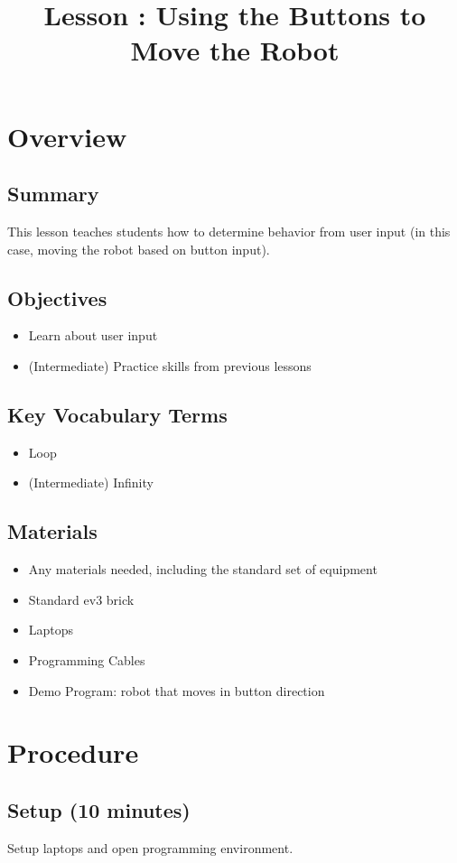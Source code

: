 \documentclass{lessonplan}
\title{Lesson \lessonNumber:  Using the Buttons to Move the Robot}
\author{\linkHome}
\date{}
\begin{document}
  \maketitle

  \section{Overview}
    \subsection{Summary}
      This lesson teaches students how to determine behavior from user input (in this case, moving the robot based on button input). 
    \subsection{Objectives}
    \begin{itemize}
      \item Learn about user input
      \item (Intermediate) Practice skills from previous lessons
    \end{itemize}
    \subsection{Key Vocabulary Terms}
    \begin{itemize}
      \item Loop
      \item (Intermediate) Infinity
    \end{itemize}
    \subsection{Materials}
      \begin{itemize}
        \item Any materials needed, including the standard set of
          equipment
        \item Standard ev3 brick
        \item Laptops
        \item Programming Cables
        \item Demo Program: robot that moves in button direction
      \end{itemize}
  \section{Procedure}
    \subsection{Setup (10 minutes)}
      Setup laptops and open programming environment.
      
\end{document}
